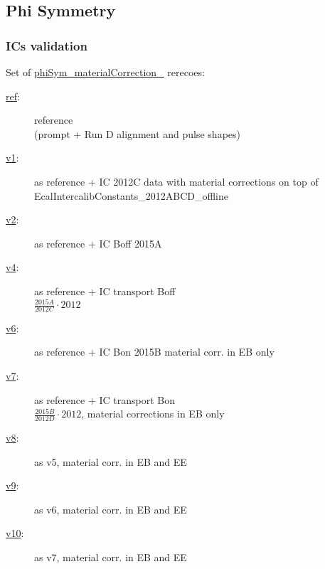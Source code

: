 \documentclass[8pt,serif]{beamer}
\begin{document}
\subsection{Phi Symmetry}

\begin{frame}
\frametitle{\phiSymmetry ICs validation}
\newcommand{\rereco}[1]{\textcolor{blue}{\url{#1}}}
Set of \rereco{phiSym_materialCorrection_} rerecoes:
\begin{description}
\item[\rereco{ref}:] reference \\
		(prompt + Run D alignment and pulse shapes)
		\item[\rereco{v1}:] as reference + IC 2012C data with material corrections on top of EcalIntercalibConstants\_2012ABCD\_offline
		\item[\rereco{v2}:] as reference + IC Boff 2015A
		\item[\rereco{v4}:] as reference + IC transport Boff \\ $\frac{2015A}{2012C}\cdot 2012$
		\item[\rereco{v6}:] as reference + IC Bon 2015B material corr. in EB only
		\item[\rereco{v7}:] as reference + IC transport Bon \\ $\frac{2015B}{2012D}\cdot 2012$, material corrections in EB only
		\item[\rereco{v8}:] as v5, material corr. in EB and EE
		\item[\rereco{v9}:] as v6, material corr. in EB and EE
		\item[\rereco{v10}:] as v7, material corr. in EB and EE
\end{description}
\end{frame}
\end{document}
